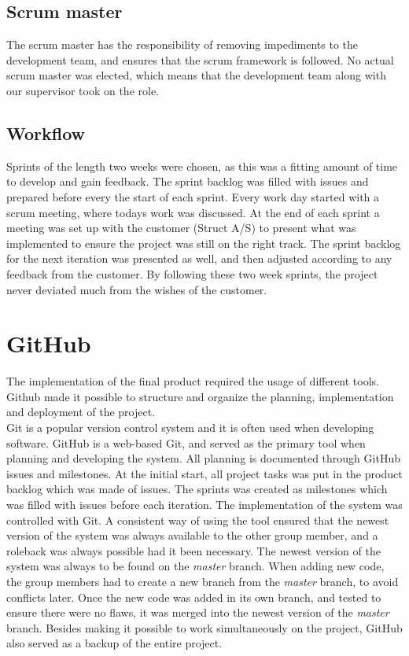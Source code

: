 \subsection{Scrum master}
The scrum master has the responsibility of removing impediments to the development team, and ensures that the scrum framework is followed. No actual scrum master was elected, which means that the development team along with our supervisor took on the role.

\subsection{Workflow}
Sprints of the length two weeks were chosen, as this was a fitting amount of time to develop and gain feedback. The sprint backlog was filled with issues and prepared before every the start of each sprint. Every work day started with a scrum meeting, where todays work was discussed. At the end of each sprint a meeting was set up with the customer (Struct A/S) to present what was implemented to ensure the project was still on the right track. The sprint backlog for the next iteration was presented as well, and then adjusted according to any feedback from the customer.
By following these two week sprints, the project never deviated much from the wishes of the customer.


\section{GitHub}
The implementation of the final product required the usage of different tools. Github made it possible to structure and organize the planning, implementation and deployment of the project.\\

Git is a popular version control system and it is often used when developing software. GitHub is a web-based Git, and served as the primary tool when planning and developing the system. All planning is documented through GitHub issues and milestones. At the initial start, all project tasks was put in the product backlog which was made of issues. The sprints was created as milestones which was filled with issues before each iteration.
The implementation of the system was controlled with Git. A consistent way of using the tool ensured that the newest version of the system was always available to the other group member, and a roleback was always possible had it been necessary. The newest version of the system was always to be found on the \textit{master} branch. When adding new code, the group members had to create a new branch from the \textit{master} branch, to avoid conflicts later. Once the new code was added in its own branch, and tested to ensure there were no flaws, it was merged into the newest version of the \textit{master} branch.
Besides making it possible to work simultaneously on the project, GitHub also served as a backup of the entire project.

